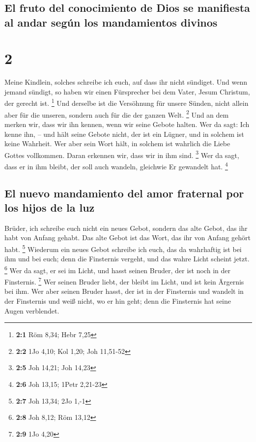 \hypertarget{el-fruto-del-conocimiento-de-dios-se-manifiesta-al-andar-seguxfan-los-mandamientos-divinos}{%
\subsection{El fruto del conocimiento de Dios se manifiesta al andar
según los mandamientos
divinos}\label{el-fruto-del-conocimiento-de-dios-se-manifiesta-al-andar-seguxfan-los-mandamientos-divinos}}

\hypertarget{section-1}{%
\section{2}\label{section-1}}

 Meine Kindlein, solches schreibe ich euch, auf dass ihr
nicht sündiget. Und wenn jemand sündigt, so haben wir einen Fürsprecher
bei dem Vater, Jesum Christum, der gerecht ist. \footnote{\textbf{2:1}
  Röm 8,34; Hebr 7,25}  Und derselbe ist die Versöhnung
für unsere Sünden, nicht allein aber für die unseren, sondern auch für
die der ganzen Welt. \footnote{\textbf{2:2} 1Jo 4,10; Kol 1,20; Joh
  11,51-52}  Und an dem merken wir, dass wir ihn kennen,
wenn wir seine Gebote halten.  Wer da sagt: Ich kenne ihn,
-- und hält seine Gebote nicht, der ist ein Lügner, und in solchem ist
keine Wahrheit.  Wer aber sein Wort hält, in solchem ist
wahrlich die Liebe Gottes vollkommen. Daran erkennen wir, dass wir in
ihm sind. \footnote{\textbf{2:5} Joh 14,21; Joh 14,23} 
Wer da sagt, dass er in ihm bleibt, der soll auch wandeln, gleichwie Er
gewandelt hat. \footnote{\textbf{2:6} Joh 13,15; 1Petr 2,21-23}

\hypertarget{el-nuevo-mandamiento-del-amor-fraternal-por-los-hijos-de-la-luz}{%
\subsection{El nuevo mandamiento del amor fraternal por los hijos de la
luz}\label{el-nuevo-mandamiento-del-amor-fraternal-por-los-hijos-de-la-luz}}

 Brüder, ich schreibe euch nicht ein neues Gebot, sondern
das alte Gebot, das ihr habt von Anfang gehabt. Das alte Gebot ist das
Wort, das ihr von Anfang gehört habt. \footnote{\textbf{2:7} Joh 13,34;
  2Jo 1,-1}  Wiederum ein neues Gebot schreibe ich euch,
das da wahrhaftig ist bei ihm und bei euch; denn die Finsternis vergeht,
und das wahre Licht scheint jetzt. \footnote{\textbf{2:8} Joh 8,12; Röm
  13,12}  Wer da sagt, er sei im Licht, und hasst seinen
Bruder, der ist noch in der Finsternis. \footnote{\textbf{2:9} 1Jo 4,20}
 Wer seinen Bruder liebt, der bleibt im Licht, und ist
kein Ärgernis bei ihm.  Wer aber seinen Bruder hasst, der
ist in der Finsternis und wandelt in der Finsternis und weiß nicht, wo
er hin geht; denn die Finsternis hat seine Augen verblendet.

